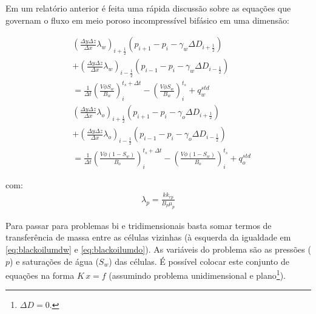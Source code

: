 \documentclass[final,5p]{elsarticle}
\numberwithin{equation}{section}
\begin{document}
        Em um relatório anterior\cite{relatoriogauss} é feita uma rápida discussão sobre as equações que governam o fluxo em meio poroso incompressível bifásico em uma dimensão:

        \begin{align}
            &\left( \frac{\Delta y \Delta z}{\Delta x} \lambda_w \right)_{i+\tfrac{1}{2}} (p_{i+1} - p_{i} - \gamma_w \Delta D_{i+\tfrac{1}{2}})  \nonumber \\
            &+ \left( \frac{\Delta y \Delta z}{\Delta x} \lambda_w \right)_{i-\tfrac{1}{2}} (p_{i-1} - p_{i} - \gamma_w \Delta D_{i-\tfrac{1}{2}}) \nonumber \\
            &  = \frac{1}{\Delta t} \left(\frac{V \phi S_w}{B_w}\right)_i^{t_s+\Delta t} - \left(\frac{V \phi S_w}{B_w}\right)_i^{t_s} + q^{std}_w \label{eq:blackoilumdw} \\
            &\left( \frac{\Delta y \Delta z}{\Delta x} \lambda_o \right)_{i+\tfrac{1}{2}} (p_{i+1} - p_{i} - \gamma_o \Delta D_{i+\tfrac{1}{2}})  \nonumber \\
            &+ \left( \frac{\Delta y \Delta z}{\Delta x} \lambda_o \right)_{i-\tfrac{1}{2}} (p_{i-1} - p_{i} - \gamma_o \Delta D_{i-\tfrac{1}{2}}) \nonumber \\
            &  = \frac{1}{\Delta t} \left(\frac{V \phi (1-S_w)}{B_o}\right)_i^{t_s+\Delta t} - \left(\frac{V \phi (1-S_w)}{B_o}\right)_i^{t_s} + q^{std}_o \label{eq:blackoilumdo}
        \end{align}

        \noindent com:
        \begin{align}
            \lambda_p = \frac{k k_{rp}}{B_p \mu_p} \nonumber
        \end{align}

        Para passar para problemas bi e tridimensionais basta somar termos de transferência de massa entre as células vizinhas (à esquerda da igualdade em \ref{eq:blackoilumdw} e \ref{eq:blackoilumdo}). As variáveis do problema são as pressões ($p$) e saturações de água ($S_w$) das células. É possível colocar este conjunto de equações na forma $K\,x=f$ (assumindo problema unidimensional e plano\footnote{$\Delta D = 0$.}).
\end{document}
